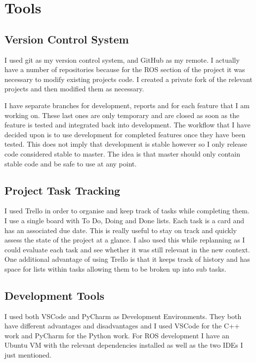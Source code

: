 \documentclass[]{../resources/final_report}
\begin{document}
\section{Tools}

\subsection{Version Control System}
I used git as my version control system, and GitHub as my remote. I actually have a number of 
repositories because for the ROS section of the project it was necessary to modify existing 
projects code. I created a private fork of the relevant projects and then modified them as necessary.

I have separate branches for development, reports and for each feature that I am working on. 
These last ones are only temporary and are closed as soon as the feature is tested and integrated 
back into development. The workflow that I have decided upon is to use development for completed 
features once they have been tested. This does not imply that development is stable however so I 
only release code considered stable to master. The idea is that master should only contain stable 
code and be safe to use at any point.

\subsection{Project Task Tracking}
I used Trello in order to organise and keep track of tasks while completing them. I use a single 
board with To Do, Doing and Done lists. Each task is a card and has an associated due date.
This is really useful to stay on track and quickly assess the state of the project at a glance. 
I also used this while replanning as I could evaluate each task and see whether it was still 
relevant in the new context. One additional advantage of using Trello is that it keeps track of 
history and has space for lists within tasks allowing them to be broken up into sub tasks.


\subsection{Development Tools}

I used both VSCode and PyCharm as Development Environments. They both have different advantages 
and disadvantages and I used VSCode for the C++ work and PyCharm for the Python work.
For ROS development I have an Ubuntu VM with the relevant dependencies installed as well as the 
two IDEs I just mentioned.
\end{document}

